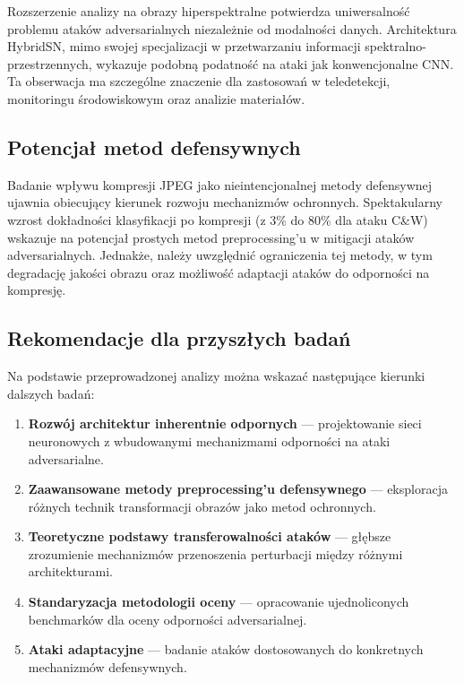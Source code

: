 \documentclass[12pt]{article}
\begin{document}
Rozszerzenie analizy na obrazy hiperspektralne potwierdza uniwersalność problemu ataków adversarialnych niezależnie od modalności danych. Architektura HybridSN, mimo swojej specjalizacji w przetwarzaniu informacji spektralno-przestrzennych, wykazuje podobną podatność na ataki jak konwencjonalne CNN. Ta obserwacja ma szczególne znaczenie dla zastosowań w teledetekcji, monitoringu środowiskowym oraz analizie materiałów.

\subsection{Potencjał metod defensywnych}

Badanie wpływu kompresji JPEG jako nieintencjonalnej metody defensywnej ujawnia obiecujący kierunek rozwoju mechanizmów ochronnych. Spektakularny wzrost dokładności klasyfikacji po kompresji (z 3\% do 80\% dla ataku C\&W) wskazuje na potencjał prostych metod preprocessing'u w mitigacji ataków adversarialnych. Jednakże, należy uwzględnić ograniczenia tej metody, w tym degradację jakości obrazu oraz możliwość adaptacji ataków do odporności na kompresję.

\subsection{Rekomendacje dla przyszłych badań}

Na podstawie przeprowadzonej analizy można wskazać następujące kierunki dalszych badań:

\begin{enumerate}
    \item \textbf{Rozwój architektur inherentnie odpornych} --- projektowanie sieci neuronowych z wbudowanymi mechanizmami odporności na ataki adversarialne.
    
    \item \textbf{Zaawansowane metody preprocessing'u defensywnego} --- eksploracja różnych technik transformacji obrazów jako metod ochronnych.
    
    \item \textbf{Teoretyczne podstawy transferowalności ataków} --- głębsze zrozumienie mechanizmów przenoszenia perturbacji między różnymi architekturami.
    
    \item \textbf{Standaryzacja metodologii oceny} --- opracowanie ujednoliconych benchmarków dla oceny odporności adversarialnej.
    
    \item \textbf{Ataki adaptacyjne} --- badanie ataków dostosowanych do konkretnych mechanizmów defensywnych.
\end{enumerate}
\end{document}
